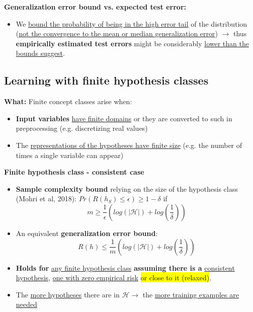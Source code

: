 \documentclass[12pt, a4paper]{article}
\begin{document}
\textbf{Generalization error bound vs. expected test error:}

\begin{itemize}
  \item We \uline{bound the probability of being in the high error tail} of the distribution (\uline{not the convergence to the mean or median generalization error}) $\rightarrow$ thus \textbf{empirically estimated test errors} might be considerably \uline{lower than the bounds suggest}.
\end{itemize}





\subsection{Learning with finite hypothesis classes
}\label{learning-with-finite-hypothesis-classes}

\textbf{What:} Finite concept classes arise when:

\begin{itemize}
  \item \textbf{Input variables} \uline{have finite domains} or they are converted to such in preprocessing (e.g. discretizing real values)
  \item The \uline{representations of the hypotheses have finite size} (e.g. the number of times a single variable can appear)
\end{itemize}

\bigskip \bigskip

\textbf{Finite hypothesis class - consistent case}

\begin{itemize}
  \item \textbf{Sample complexity bound} relying on the size of the hypothesis class (Mohri et al, 2018): $Pr(R(h_S) \leq \epsilon) \geq 1 - \delta$ if
  \[
  m \geq \frac{1}{\epsilon}(log(|\mathcal{H}|) + log(\frac{1}{\delta}))
  \]
  \item An equivalent \textbf{generalization error bound}:
  \[
  R(h) \leq \frac{1}{m}(log(|\mathcal{H}|) + log(\frac{1}{\delta}))
  \]
  \item \textbf{Holds for} \uline{any finite hypothesis class}
  \textbf{assuming there is a} \uline{consistent hypothesis}, \uline{one with zero empirical risk} \colorbox{Yellow}{or close to it (relaxed)}.
  \item The \uline{more hypotheses} there are in $\mathcal{H} \rightarrow$ the \uline{more training examples are needed}
\end{itemize}
\end{document}
